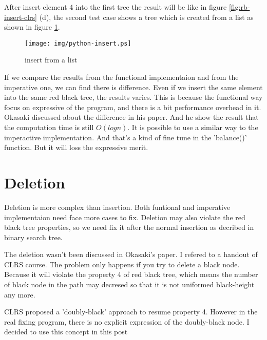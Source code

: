 \documentclass{article}
\begin{document}
After insert element 4 into the first tree the result will be like in figure \ref{fig:rb-insert-clrs} (d), the second test case shows a tree which is created from a list as shown in figure \ref{fig:python-insert}.

\begin{figure}[htbp]
       \begin{center}
	\texttt{[image: img/python-insert.ps]}
        \caption{insert from a list} \label{fig:python-insert}
       \end{center}
\end{figure}

If we compare the results from the functional implementaion and from the imperative one, we can 
find there is difference. Even if we insert the same element into the same red black tree, the
results varies. This is because the functional way focus on expressive of the program, and there 
is a bit performance overhead in it. Okasaki discussed about the difference in his paper\cite{okasaki}.
And he show the result that the computation time is still $O(log n)$. It is possible to use a 
similar way to the imperactive implementation. And that's a kind of fine tune in the 'balance()'
function. But it will loss the expressive merit.


\section{Deletion}

Deletion is more complex than insertion. Both funtional and imperative implementaion 
need face more cases to fix. Deletion may also violate the red black tree properties,
so we need fix it after the normal insertion as decribed in binary search tree\cite{bst-lxy}.

The deletion wasn't been discussed in Okasaki's paper\cite{okasaki}. I refered to a
handout of CLRS course\cite{lyn}. The problem only happens if you try to delete a black node.
Because it will violate the property 4 of red black tree, which means the number of black
node in the path may decresed so that it is not uniformed black-height any more.

CLRS proposed a 'doubly-black' approach to resume property 4. However in the real fixing
program, there is no explicit expression of the doubly-black node. I decided to use
this concept in this post
\end{document}
